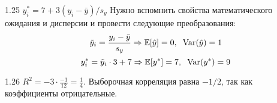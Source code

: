 \protect \hypertarget {soln:1.25}{}
\begin{solution}{{1.25}}
$y_i^*=7+3(y_i-\bar{y})/s_y$
Нужно вспомнить свойства математического ожидания и дисперсии и провести следующие преобразования:
\[
\tilde{y}_i = \frac{y_i-\bar{y}}{s_y} \Rightarrow \mathbb{E}[\tilde{y}] = 0, \hspace{2mm} \operatorname{Var}(\tilde{y}) = 1
\]
\[
y^*_i = \tilde{y}_i\cdot3 + 7 \Rightarrow \mathbb{E}[y^*] = 7, \hspace{2mm} \operatorname{Var}(y^*) = 9
\]
\end{solution}
\protect \hypertarget {soln:1.26}{}
\begin{solution}{{1.26}}
  $R^2 = -3 \cdot \frac{-1}{12}=\frac{1}{4}$. Выборочная корреляция равна $-1/2$, так как коэффициенты отрицательные.
\end{solution}
